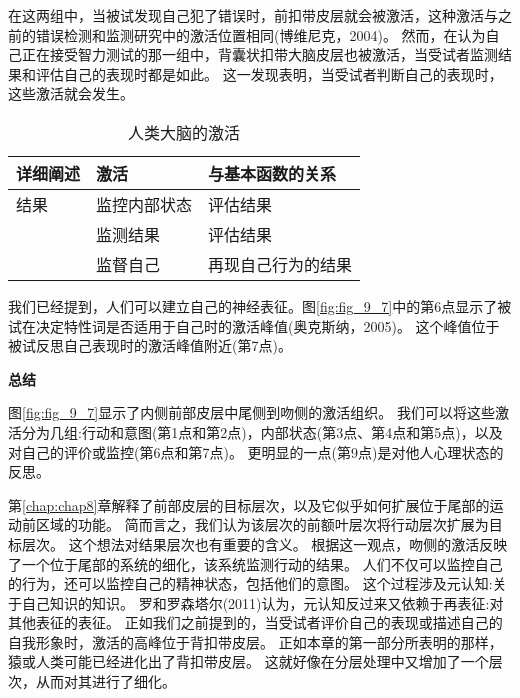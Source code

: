 在这两组中，当被试发现自己犯了错误时，前扣带皮层就会被激活，这种激活与之前的错误检测和监测研究中的激活位置相同(博维尼克，2004)。
然而，在认为自己正在接受智力测试的那一组中，背囊状扣带大脑皮层也被激活，当受试者监测结果和评估自己的表现时都是如此。
这一发现表明，当受试者判断自己的表现时，这些激活就会发生。
\par


\begin{table}[htbp] 
	\newcommand{\tabincell}[2]{\begin{tabular}{@{}#1@{}}#2\end{tabular}} %
	\centering
	\caption{人类大脑的激活\label{tab:9_5}}
	\renewcommand\arraystretch{1.5}	%
	\begin{tabular}{lll}
		\toprule
		详细阐述 & 激活 & 与基本函数的关系\\
		\midrule
		结果 & 监控内部状态 & 评估结果  \\
		& 监测结果 & 评估结果 \\
		& 监督自己 & 再现自己行为的结果 \\
		\bottomrule
		
	\end{tabular}%
\end{table}%


我们已经提到，人们可以建立自己的神经表征。图\ref{fig:fig_9_7}中的第6点显示了被试在决定特性词是否适用于自己时的激活峰值(奥克斯纳，2005)。
这个峰值位于被试反思自己表现时的激活峰值附近(第7点)。
\par


\textbf{总结}
\par
图\ref{fig:fig_9_7}显示了内侧前部皮层中尾侧到吻侧的激活组织。
我们可以将这些激活分为几组:行动和意图(第1点和第2点)，内部状态(第3点、第4点和第5点)，以及对自己的评价或监控(第6点和第7点)。
更明显的一点(第9点)是对他人心理状态的反思。
\par


第\ref{chap:chap8}章解释了前部皮层的目标层次，以及它似乎如何扩展位于尾部的运动前区域的功能。
简而言之，我们认为该层次的前额叶层次将行动层次扩展为目标层次。
这个想法对结果层次也有重要的含义。
根据这一观点，吻侧的激活反映了一个位于尾部的系统的细化，该系统监测行动的结果。
人们不仅可以监控自己的行为，还可以监控自己的精神状态，包括他们的意图。
这个过程涉及元认知:关于自己知识的知识。
罗和罗森塔尔(2011)认为，元认知反过来又依赖于再表征:对其他表征的表征。
正如我们之前提到的，当受试者评价自己的表现或描述自己的自我形象时，激活的高峰位于背扣带皮层。
正如本章的第一部分所表明的那样，猿或人类可能已经进化出了背扣带皮层。
这就好像在分层处理中又增加了一个层次，从而对其进行了细化。



